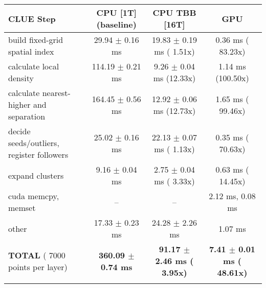     \begin{tabular}{l|c|c|c}
    \hline
    CLUE Step                                 & CPU [1T] (baseline)         & CPU TBB [16T]                         & GPU                       \\ \hline
    build fixed-grid spatial index            &  29.94 $\pm$  0.16 ms       &  19.83 $\pm$  0.19 ms ( 1.51x)        &   0.36 ms ( 83.23x)       \\
    calculate local density                   & 114.19 $\pm$  0.21 ms       &   9.26 $\pm$  0.04 ms (12.33x)        &   1.14 ms (100.50x)       \\
    calculate nearest-higher and separation   & 164.45 $\pm$  0.56 ms       &  12.92 $\pm$  0.06 ms (12.73x)        &   1.65 ms ( 99.46x)       \\
    decide seeds/outliers, register followers &  25.02 $\pm$  0.16 ms       &  22.13 $\pm$  0.07 ms ( 1.13x)        &   0.35 ms ( 70.63x)       \\
    expand clusters                           &   9.16 $\pm$  0.04 ms       &   2.75 $\pm$  0.04 ms ( 3.33x)        &   0.63 ms ( 14.45x)       \\ \hline
    cuda memcpy, memset                       & --                          & --                                    &   2.12 ms,   0.08 ms      \\ 
    other                                     &  17.33 $\pm$  0.23 ms       &  24.28 $\pm$  2.26 ms                 &   1.07 ms                 \\ \hline
    \textbf{TOTAL} ( 7000 points per layer)   & \textbf{360.09 $\pm$  0.74 ms} & \textbf{ 91.17 $\pm$  2.46 ms ( 3.95x)} & \textbf{  7.41 $\pm$  0.01 ms ( 48.61x)}  \\
    \hline
    \multicolumn{4}{c}{} 
    \end{tabular}
    \linebreak


